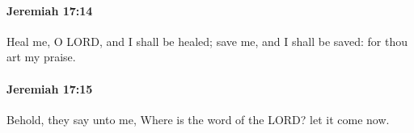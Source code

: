 		\paragraph{Jeremiah 17:14} %
			\label{JEREMIAH-17-14}

			Heal me, O LORD, and I shall be healed; save me, and I shall be saved: for thou art my praise.


		\paragraph{Jeremiah 17:15} %
			\label{JEREMIAH-17-15}

			Behold, they say unto me, Where is the word of the LORD? let it come now.



